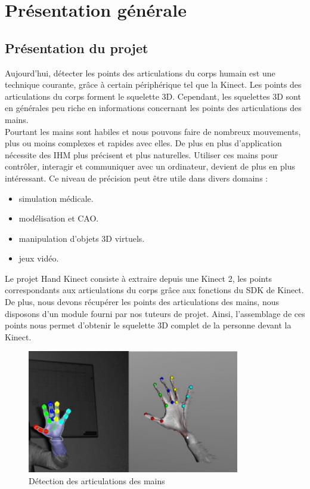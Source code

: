 \chapter{Présentation générale}



\section{Présentation du projet}
Aujourd'hui, détecter les points des articulations du corps humain 
est une technique courante, grâce à certain périphérique tel que la 
Kinect. Les points des articulations du corps forment le squelette 3D. 
Cependant, les squelettes 3D sont en générales peu riche en informations 
concernant les points des articulations des mains.\\
 
Pourtant les mains sont habiles et nous pouvons faire de nombreux 
mouvements, plus ou moins complexes et rapides avec elles. De plus en 
plus d'application nécessite des IHM plus précisent et plus 
naturelles. Utiliser ces mains pour contrôler, interagir et communiquer 
avec un ordinateur, devient de plus en plus intéressant. Ce niveau de 
précision peut être utile dans divers domains :
\begin{itemize}
  \item simulation médicale.
  \item modélisation et CAO.
  \item manipulation d'objets 3D virtuels.
  \item jeux vidéo.\\
\end{itemize}

Le projet \og Hand Kinect \fg consiste à extraire depuis une Kinect 2, 
les points correspondants aux articulations du corps grâce aux 
fonctions du SDK de Kinect. De plus, nous devons récupérer les points 
des articulations des mains, nous disposons d'un module fourni par 
nos tuteurs de projet. Ainsi, l'assemblage de ces points nous permet 
d'obtenir le squelette 3D complet de la personne devant la Kinect.\\

\begin{figure}[H]
  \begin{center}
    \includegraphics[width=350px]{images/joint_detection.png}
    \caption{Détection des articulations des mains}
  \end{center}
\end{figure}

